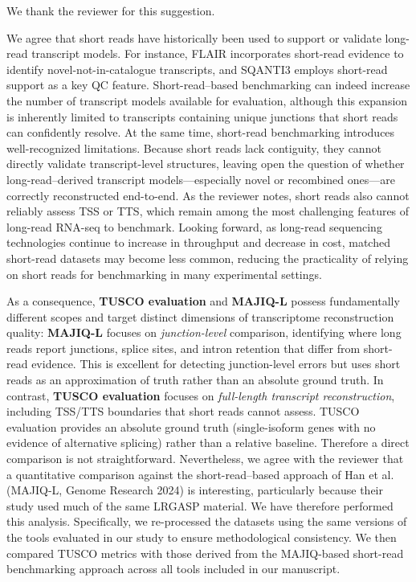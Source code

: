 \documentclass[11pt]{article}
\newcommand{\tuscoEvaluation}{TUSCO evaluation}
\newcommand{\tuscoMetrics}{TUSCO metrics}
\begin{document}
\begin{responseboxnew}

We thank the reviewer for this suggestion.

    \vspace{0.3cm}
 We agree that short reads have historically been used to support or validate long-read transcript models. For instance, FLAIR incorporates short-read evidence to identify novel-not-in-catalogue transcripts, and SQANTI3 employs short-read support as a key QC feature. Short-read--based benchmarking can indeed increase the number of transcript models available for evaluation, although this expansion is inherently limited to transcripts containing unique junctions that short reads can confidently resolve.
At the same time, short-read benchmarking introduces well-recognized limitations. Because short reads lack contiguity, they cannot directly validate transcript-level structures, leaving open the question of whether long-read--derived transcript models---especially novel or recombined ones---are correctly reconstructed end-to-end. As the reviewer notes, short reads also cannot reliably assess TSS or TTS, which remain among the most challenging features of long-read RNA-seq to benchmark. Looking forward, as long-read sequencing technologies continue to increase in throughput and decrease in cost, matched short-read datasets may become less common, reducing the practicality of relying on short reads for benchmarking in many experimental settings.

    \vspace{0.3cm}
    As a consequence, \textbf{\tuscoEvaluation{}} and \textbf{MAJIQ-L} possess fundamentally different scopes and target distinct dimensions of transcriptome reconstruction quality: \textbf{MAJIQ-L} focuses on \textit{junction-level} comparison, identifying where long reads report junctions, splice sites, and intron
        retention that differ from short-read evidence. This is excellent for detecting junction-level errors but uses short reads as an approximation of truth rather than an absolute ground truth. In contrast, \textbf{\tuscoEvaluation{}} focuses on \textit{full-length transcript reconstruction}, including TSS/TTS boundaries that short reads cannot assess. \tuscoEvaluation{} provides an absolute ground truth (single-isoform genes with no evidence of alternative splicing) rather than a relative baseline. Therefore a direct comparison is not straightforward.
    Nevertheless, we agree with the reviewer that a quantitative comparison against the short-read--based approach of Han et al. (MAJIQ-L, Genome Research 2024) is interesting, particularly because their study used much of the same LRGASP material. We have therefore performed this analysis. Specifically, we re-processed the datasets using the same versions of the tools evaluated in our study to ensure methodological consistency. We then compared \tuscoMetrics{} with those derived from the MAJIQ-based short-read benchmarking approach across all tools included in our manuscript.


\end{responseboxnew}
\end{document}

